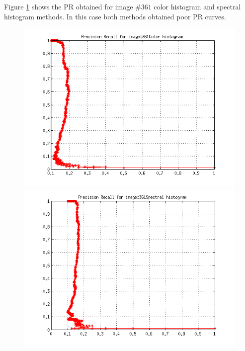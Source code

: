 \documentclass[a4paper,12pt]{article}
\begin{document}
Figure \ref{fig:bad} shows the PR obtained for image $\#361$ color histogram and spectral histogram methods. In this case both methods obtained poor PR curves.
\begin{figure}[h!]
    \centering
    \includegraphics[totalheight=.24\textheight]{../Results/PR/BadColor.png}
    \includegraphics[totalheight=.24\textheight]{../Results/PR/BadSpectral.png}
    \label{fig:bad}
\end{figure}
\end{document}
